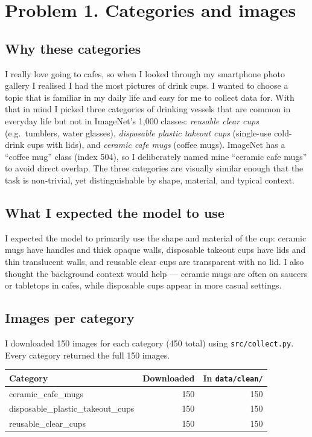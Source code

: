 \documentclass[11pt]{article}
\begin{document}
\makeheader

\section*{Problem 1. Categories and images}

\subsection*{Why these categories}
I really love going to cafes, so when I looked through my smartphone photo
gallery I realised I had the most pictures of drink cups.  I wanted to choose a
topic that is familiar in my daily life and easy for me to collect data for.
With that in mind I picked three categories of drinking vessels that are
common in everyday life but not in ImageNet's 1,000 classes:
\emph{reusable clear cups} (e.g.\ tumblers, water glasses),
\emph{disposable plastic takeout cups} (single-use cold-drink cups with lids),
and \emph{ceramic cafe mugs} (coffee mugs).  ImageNet has a ``coffee mug''
class (index 504), so I deliberately named mine ``ceramic cafe mugs'' to avoid
direct overlap.  The three categories are visually similar enough that the
task is non-trivial, yet distinguishable by shape, material, and typical
context.

\subsection*{What I expected the model to use}
I expected the model to primarily use the shape and material of the cup: ceramic mugs have handles and thick opaque walls, disposable takeout cups have lids and thin translucent walls, and reusable clear cups are transparent with no lid. I also thought the background context would help --- ceramic mugs are often on saucers or tabletops in cafes, while disposable cups appear in more casual settings.

\subsection*{Images per category}
I downloaded 150 images for each category (450 total) using
\texttt{src/collect.py}.  Every category returned the full 150 images.

\begin{center}
\begin{tabular}{lrr}
\toprule
Category & Downloaded & In \texttt{data/clean/} \\
\midrule
ceramic\_cafe\_mugs             & 150 & 150 \\
disposable\_plastic\_takeout\_cups & 150 & 150 \\
reusable\_clear\_cups            & 150 & 150 \\
\bottomrule
\end{tabular}
\end{center}
\end{document}
